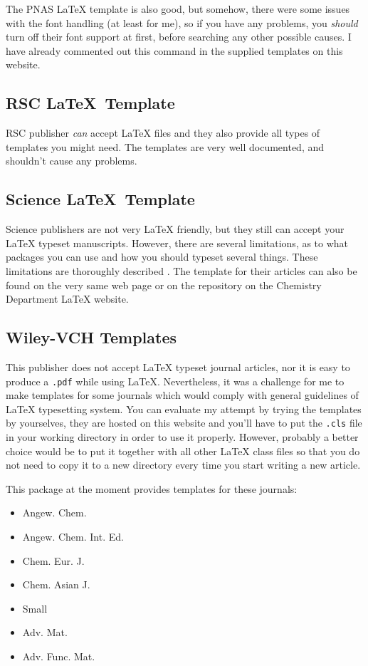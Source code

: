 The PNAS \LaTeX{} template is also good, but somehow, there were some issues
with the font handling (at least for me), so if you have any problems, you
\emph{should} turn off their font support at first, before searching any other
possible causes.
%
I have already commented out this command in the supplied templates on this
website.

\subsection{RSC \LaTeX\ Template}

RSC publisher \emph{can} accept \LaTeX{} files and they also provide all types
of templates you might need.
%
The templates are very well documented, and shouldn't cause any problems.

\subsection{Science \LaTeX\ Template}

Science publishers are not very \LaTeX{} friendly, but they still can accept
your \LaTeX{} typeset manuscripts.
%
However, there are several limitations, as to what packages you can use and how
you should typeset several things.
%
These limitations are thoroughly described
.
%
The template for their articles can also be found on the very same web page or
on the repository on the Chemistry Department \LaTeX{} website.

\subsection{Wiley-VCH Templates}

This publisher does not accept \LaTeX{} typeset journal articles, nor it is easy
to produce a \verb|.pdf| while using \LaTeX{}.
%
Nevertheless, it was a challenge for me to make templates for some journals
which would comply with general guidelines of \LaTeX{} typesetting system.
%
You can evaluate my attempt by trying the templates by yourselves, they are
hosted on this website and you'll have to put the \verb|.cls| file in your
working directory in order to use it properly.
%
However, probably a better choice would be to put it together with all other
\LaTeX{} class files so that you do not need to copy it to a new directory
every time you start writing a new article.

This package at the moment provides templates for these journals:
\begin{itemize}
    \item Angew. Chem.
    \item Angew. Chem. Int. Ed.
    \item Chem. Eur. J.
    \item Chem. Asian J.
    \item Small
    \item Adv. Mat.
    \item Adv. Func. Mat.
\end{itemize}

